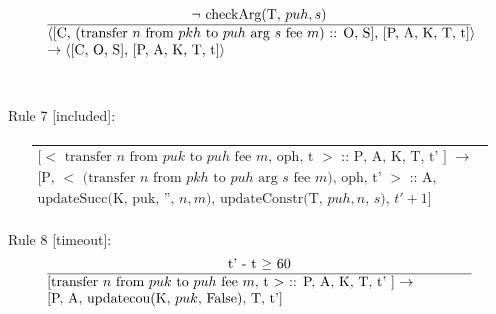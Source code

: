 \documentclass[a4paper]{llncs}
\begin{document}
\begin{equation}{}
\frac{\text{$\neg$ checkArg(T, $puh, s$)}}{\parbox{4.2in}{\text{$\langle$[C, (transfer ${n}$ from ${pkh}$ to  ${puh}$ arg ${s}$ fee ${m}$) :: O, S], [P, A, K, T, t]$\rangle$}\\
\text{$\rightarrow \langle$[C, O, S], [P, A, K, T, t]$\rangle$}}} 
\end{equation}
~\\
~\\
Rule 7 [included]:

\begin{equation}
\frac{}{
  \begin{array}{l}
\text{[$<$ transfer $n$ from $puk$ to  $puh$ fee $m$, oph, t $>$ :: P, A, K, T, t' ] $\rightarrow$ } \\
\text{[P, $<$ (transfer ${n}$ from ${pkh}$ to  ${puh}$ arg ${s}$ fee ${m}$), oph, t' $>$ :: A, } \\
\text{updateSucc(K, puk, '', $n, m$), updateConstr(T, $puh, n$,
  $s$), $t' + 1$]}
  \end{array}
}\label{eq:1}
\end{equation}
~\\
Rule 8 [timeout]:
\begin{equation}{}
\frac{\text{t' - t $\ge$ 60}}{\parbox{4.2in}{\text{[transfer $n$ from $puk$ to  $puh$ fee $m$, t $>$ :: P, A, K, T, t' ] $\rightarrow$} \\
\text{[P, A, updatecou(K, $puk$, False), T, t']}}} 
\end{equation}
\end{document}
